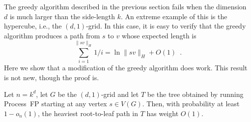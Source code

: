 \documentclass[lotsofwhite]{patmorin}
\begin{document}
The greedy algorithm described in the previous section fails when the
dimension $d$ is much larger than the side-length $k$.  An extreme
example of this is the hypercube, i.e., the $(d,1)$-grid.  In this case,
it is easy to verify that the greedy algorithm produces a path from $s$
to $v$ whose expected length is
\[
    \sum_{i=1}^{\|sv\|_H} 1/i = \ln \|sv\|_H + O(1) \enspace . 
\]
Here we show that a modification of the greedy algorithm does work.
This result is not new, though the proof is.

\begin{thm}
  Let $n=k^d$, let $G$ be the $(d,1)$-grid and let $T$ be the tree obtained
  by running Process~FP starting at any vertex $s\in V(G)$.  Then,
  with probability at least $1-o_n(1)$, the heaviest root-to-leaf path
  in $T$ has weight $O(1)$.
\end{thm}
\end{document}
